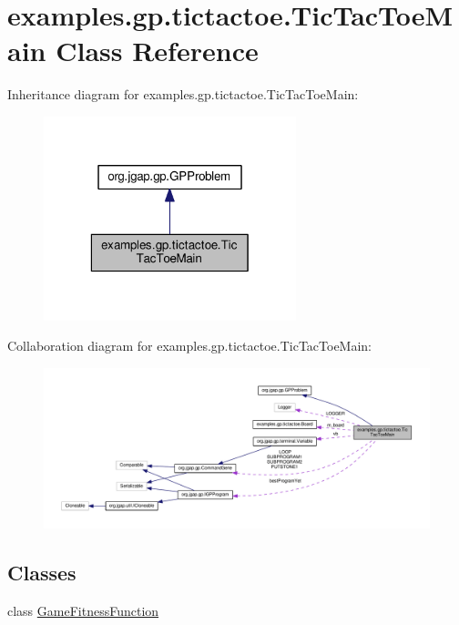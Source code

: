 \hypertarget{classexamples_1_1gp_1_1tictactoe_1_1_tic_tac_toe_main}{\section{examples.\-gp.\-tictactoe.\-Tic\-Tac\-Toe\-Main Class Reference}
\label{classexamples_1_1gp_1_1tictactoe_1_1_tic_tac_toe_main}
}


Inheritance diagram for examples.\-gp.\-tictactoe.\-Tic\-Tac\-Toe\-Main\-:
\nopagebreak
\begin{figure}[H]
\begin{center}
\leavevmode
\includegraphics[width=208pt]{classexamples_1_1gp_1_1tictactoe_1_1_tic_tac_toe_main__inherit__graph}
\end{center}
\end{figure}


Collaboration diagram for examples.\-gp.\-tictactoe.\-Tic\-Tac\-Toe\-Main\-:
\nopagebreak
\begin{figure}[H]
\begin{center}
\leavevmode
\includegraphics[width=350pt]{classexamples_1_1gp_1_1tictactoe_1_1_tic_tac_toe_main__coll__graph}
\end{center}
\end{figure}
\subsection*{Classes}
\begin{DoxyCompactItemize}
\item 
class \hyperlink{classexamples_1_1gp_1_1tictactoe_1_1_tic_tac_toe_main_1_1_game_fitness_function}{Game\-Fitness\-Function}
\end{DoxyCompactItemize}
